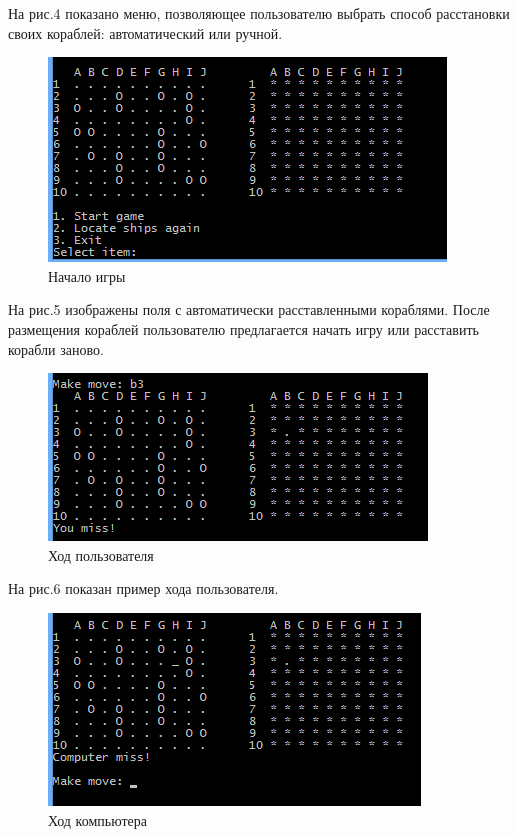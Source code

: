 \documentclass[a4paper]{article}
\begin{document}
На рис.4 показано меню, позволяющее пользователю выбрать способ расстановки своих кораблей: автоматический или ручной.

\begin{figure}[H]
	\begin{center}
		\includegraphics[scale=0.6]{screen/console_start_game.png}
		\caption{Начало игры} 
		\label{pic:pic_name} %
	\end{center}
\end{figure}

На рис.5 изображены поля с автоматически расставленными кораблями. После размещения кораблей пользователю предлагается начать игру или расставить корабли заново.

\begin{figure}[H]
	\begin{center}
		\includegraphics[scale=0.6]{screen/console_user_move.png}
		\caption{Ход пользователя} 
		\label{pic:pic_name} %
	\end{center}
\end{figure}

На рис.6 показан пример хода пользователя. 

\begin{figure}[H]
	\begin{center}
		\includegraphics[scale=0.6]{screen/console_computer_move.png}
		\caption{Ход компьютера} 
		\label{pic:pic_name} %
	\end{center}
\end{figure}
\end{document}

